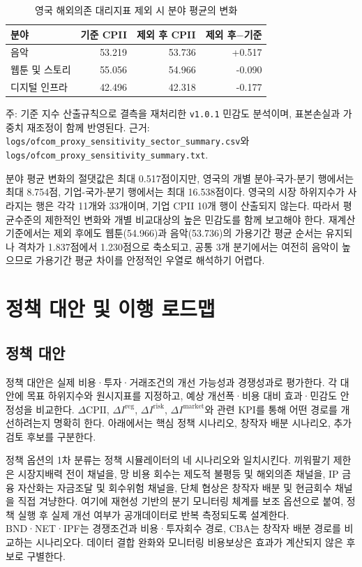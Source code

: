 \documentclass[11pt,a4paper]{report}
\begin{document}
\begin{table}[H]
\centering\small
\caption{영국 해외의존 대리지표 제외 시 분야 평균의 변화}
\label{tab:ofcom_sensitivity_revision}
\begin{tabular}{L{3.2cm}rrr}
\toprule
{}
분야 & 기준 CPII & 제외 후 CPII & 제외 후$-$기준 \\
\midrule
음악 & 53.219 & 53.736 & +0.517 \\
웹툰 및 스토리 & 55.056 & 54.966 & -0.090 \\
디지털 인프라 & 42.496 & 42.318 & -0.177 \\
\bottomrule
\end{tabular}
{\par\raggedright\footnotesize 주: 기준 지수 산출규칙으로 결측을 재처리한 \texttt{v1.0.1} 민감도 분석이며, 표본손실과 가중치 재조정이 함께 반영된다. 근거: \nolinkurl{logs/ofcom_proxy_sensitivity_sector_summary.csv}와 \nolinkurl{logs/ofcom_proxy_sensitivity_summary.txt}.\par}
\end{table}

분야 평균 변화의 절댓값은 최대 0.517점이지만, 영국의 개별 분야-국가-분기 행에서는 최대 8.754점, 기업-국가-분기 행에서는 최대 16.538점이다. 영국의 시장 하위지수가 사라지는 행은 각각 11개와 33개이며, 기업 CPII 10개 행이 산출되지 않는다. 따라서 평균수준의 제한적인 변화와 개별 비교대상의 높은 민감도를 함께 보고해야 한다. 재계산 기준에서는 제외 후에도 웹툰(54.966)과 음악(53.736)의 가용기간 평균 순서는 유지되나 격차가 1.837점에서 1.230점으로 축소되고, 공통 3개 분기에서는 여전히 음악이 높으므로 가용기간 평균 차이를 안정적인 우열로 해석하기 어렵다.

\chapter{정책 대안 및 이행 로드맵}
\section{정책 대안}
정책 대안은 실제 비용·투자·거래조건의 개선 가능성과 경쟁성과로 평가한다. 각 대안에 목표 하위지수와 원시지표를 지정하고, 예상 개선폭·비용 대비 효과·민감도 안정성을 비교한다. $\Delta \mathrm{CPII}$, $\Delta I^{\mathrm{reg}}$, $\Delta I^{\mathrm{risk}}$, $\Delta I^{\mathrm{market}}$와 관련 KPI를 통해 어떤 경로를 개선하려는지 명확히 한다. 아래에서는 핵심 정책 시나리오, 창작자 배분 시나리오, 추가 검토 후보를 구분한다.

정책 옵션의 1차 분류는 정책 시뮬레이터의 네 시나리오와 일치시킨다. 끼워팔기 제한은 시장지배력 전이 채널을, 망 비용 회수는 제도적 불평등 및 해외의존 채널을, IP 금융 자산화는 자금조달 및 회수위험 채널을, 단체 협상은 창작자 배분 및 현금회수 채널을 직접 겨냥한다. 여기에 재현성 기반의 분기 모니터링 체계를 보조 옵션으로 붙여, 정책 실행 후 실제 개선 여부가 공개데이터로 반복 측정되도록 설계한다. BND·NET·IPF는 경쟁조건과 비용·투자회수 경로, CBA는 창작자 배분 경로를 비교하는 시나리오다. 데이터 결합 완화와 모니터링 비용보상은 효과가 계산되지 않은 후보로 구별한다.
\end{document}

